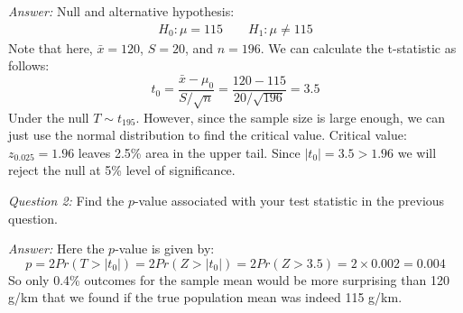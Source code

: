 \documentclass{./../../Latex/handout}
\begin{document}
\textit{Answer:} Null and alternative hypothesis:
 \begin{align*}
  	 H_0: \mu = 115 \quad \quad H_1: \mu \neq 115 
  \end{align*}
  Note that here, $\bar{x}=120$, $S=20$, and $n=196$. We can calculate the t-statistic as follows:
  $$ t_0 = \frac{\bar{x}-\mu_0}{S/\sqrt{n}} =  \frac{120-115}{20/\sqrt{196}} = 3.5 $$
Under the null $T \sim t_{195}$. However, since the sample size is large enough, we can just use the normal distribution to find the critical value. Critical value: $z_{0.025} = 1.96$ leaves 2.5\% area in the upper tail. Since $|t_0|=3.5>1.96$ we will reject the null at 5\% level of significance.  

\textit{Question 2:} Find the $p$-value associated with your test statistic in the previous question.

\textit{Answer:} Here the $p$-value is given by:
$$p=2Pr(T>|t_0|)=2Pr(Z>|t_0|) = 2Pr(Z>3.5) = 2 \times 0.002 = 0.004$$ 
So only 0.4\% outcomes for the sample mean would be more surprising than 120 g/km that we found if the true population mean was indeed 115 g/km.
\end{document}
